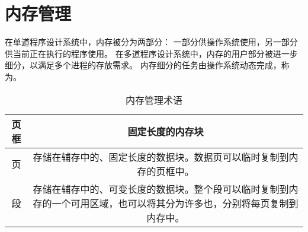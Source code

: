 
\chapter{内存管理}
{
    在单道程序设计系统中，内存被分为两部分：
    一部分供操作系统使用，另一部分供当前正在执行的程序使用。
    在多道程序设计系统中，内存的用户部分被进一步细分，以满足多个进程的存放需求。
    内存细分的任务由操作系统动态完成，称为。

    \begin{table}[htb]
        \centering

        \caption{内存管理术语}

        \begin{tabular}{c|c}
            \hline
            页框 & 固定长度的内存块 \\
            \hline
            页 & 存储在辅存中的、固定长度的数据块。数据页可以临时复制到内存的页框中。 \\
            \hline
            段 & 存储在辅存中的、可变长度的数据块。整个段可以临时复制到内存的一个可用区域，也可以将其分为许多也，分别将每页复制到内存中。 \\
            \hline
        \end{tabular}
    \end{table}

    
    
    
    
    
}

\cleardoublepage

\endinput
